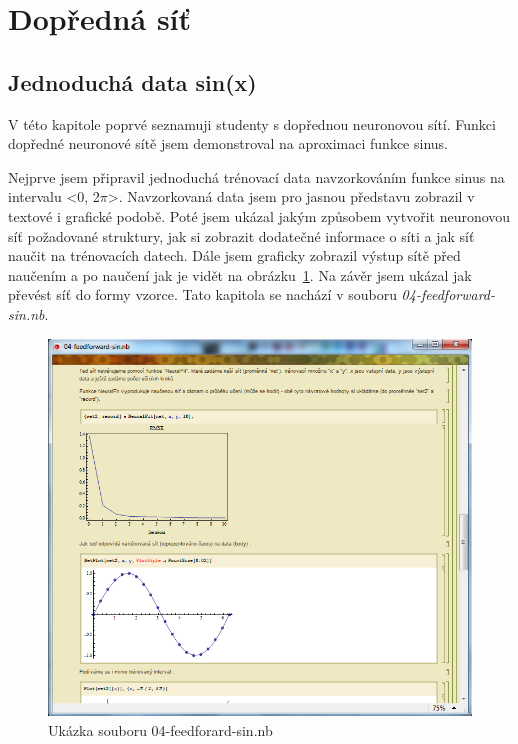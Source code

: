 \documentclass[11pt,twoside,a4paper]{book}
\begin{document}
\section{Dopředná síť}
\subsection{Jednoduchá data sin(x)}
V této kapitole poprvé seznamuji studenty s dopřednou neuronovou sítí. Funkci dopředné neuronové sítě jsem demonstroval na aproximaci funkce sinus.

Nejprve jsem připravil jednoduchá trénovací data navzorkováním funkce sinus na intervalu <0, 2\begin{math}\pi \end{math}>. Navzorkovaná data jsem pro jasnou představu zobrazil v textové i grafické podobě. Poté jsem ukázal jakým způsobem vytvořit neuronovou síť požadované struktury, jak si zobrazit dodatečné informace o síti a jak síť naučit na trénovacích datech. Dále jsem graficky zobrazil výstup sítě před naučením a po naučení jak je vidět na obrázku~\ref{fig:feedforward-sin}. Na závěr jsem ukázal jak převést síť do formy vzorce. Tato kapitola se nachází v souboru \textit{04-feedforward-sin.nb}.

\begin{figure}[h!]
\begin{center}
\includegraphics[height=10cm]{figures/ukazka04.png}
\caption{Ukázka souboru 04-feedforard-sin.nb}
\label{fig:feedforward-sin}
\end{center}
\end{figure}
\end{document}
